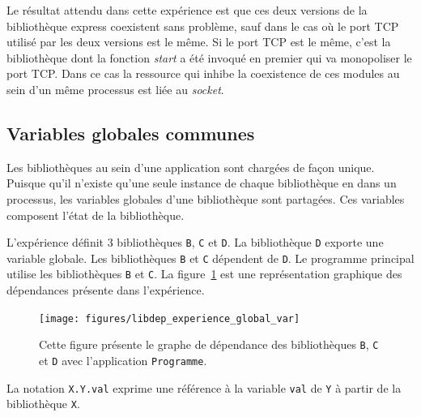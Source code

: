 Le résultat attendu dans cette expérience est que ces deux versions de la bibliothèque
express coexistent sans problème, sauf dans le cas où le port TCP utilisé par les deux
versions est le même. Si le port TCP est le même, c'est la bibliothèque dont la fonction
\textit{start} a été invoqué en premier qui va monopoliser le port TCP. Dans ce cas
la ressource qui inhibe la coexistence de ces modules au sein d'un même processus
est liée au \textit{socket}.

\subsection{Variables globales communes}

Les bibliothèques au sein d'une application sont chargées de façon unique.
Puisque qu'il n'existe qu'une seule instance de chaque bibliothèque en dans un
processus, les variables globales d'une bibliothèque sont partagées. Ces variables
composent l'état de la bibliothèque.

L'expérience définit 3 bibliothèques \texttt{B}, \texttt{C} et \texttt{D}. La bibliothèque
\texttt{D} exporte une variable globale. Les bibliothèques \texttt{B} et \texttt{C} dépendent
de \texttt{D}. Le programme principal utilise les bibliothèques \texttt{B} et \texttt{C}.
La figure~\ref{fig:libdep_experience_global_var} est une représentation graphique des dépendances
présente dans l'expérience.

\begin{figure}[ht]
  \centering
  \texttt{[image: figures/libdep\_experience\_global\_var]}
  \caption{Cette figure présente le graphe de dépendance des bibliothèques \texttt{B}, \texttt{C} et \texttt{D}
    avec l'application \texttt{Programme}.}
  \label{fig:libdep_experience_global_var}
\end{figure}

La notation \texttt{X.Y.val} exprime une référence à la variable \texttt{val}
de \texttt{Y} à partir de la bibliothèque \texttt{X}.

